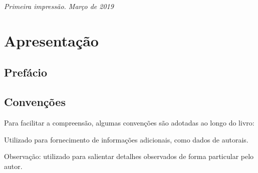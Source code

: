 \documentclass[11pt,fleqn]{book} %
\begin{document}
\noindent \textit{Primeira impressão. Março de 2019} %




\pagestyle{empty} %

\tableofcontents %

\cleardoublepage %

\pagestyle{fancy} %



\chapter*{Apresentação}

\section*{Prefácio}

\lipsum[1-2]

\section*{Convenções}

Para facilitar a compreensão, algumas convenções são adotadas ao longo do livro:

\begin{info}
	Utilizado para fornecimento de informações adicionais, como dados de autorais.
\end{info}

\begin{obs}
	Observação: utilizado para salientar detalhes observados de forma particular pelo autor.
\end{obs}
\end{document}
